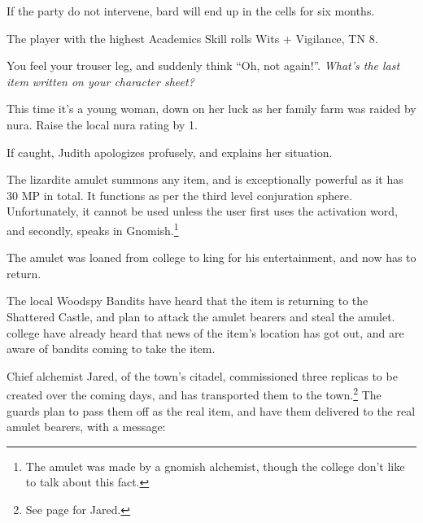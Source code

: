 \begin{multicols}{2}
If the party do not intervene, \gls{bard} will end up in the cells for six months.


The player with the highest Academics Skill rolls Wits + Vigilance, TN 8.

\begin{boxtext}

	You feel your trouser leg, and suddenly think ``Oh, not again!''.  \textit{What's the last item written on your character sheet?}

\end{boxtext}

This time it's a young woman, down on her luck as her family farm was raided by nura.  Raise the local nura rating by 1.

If caught, Judith apologizes profusely, and explains her situation.


\humanthief

\resumecontents[villages]
\label{lizardite}
\stopcontents[villages]

\startcontents[sq]

\sqminitoc

The lizardite amulet summons any item, and is exceptionally powerful as it has 30 MP in total.  It functions as per the third level conjuration sphere.  Unfortunately, it cannot be used unless the user first uses the activation word, and secondly, speaks in Gnomish.\footnote{The amulet was made by a gnomish alchemist, though the college don't like to talk about this fact.}

The amulet was loaned from \gls{college} to \gls{king} for his entertainment, and now has to return.


The local Woodspy Bandits have heard that the item is returning to the Shattered Castle, and plan to attack the amulet bearers and steal the amulet.
\Gls{college} have already heard that news of the item's location has got out, and are aware of bandits coming to take the item.

Chief alchemist Jared, of the town's citadel, commissioned three replicas to be created over the coming days, and has transported them to the town.\footnote{See page \pageref{citadel_alchemist} for Jared.}
The guards plan to pass them off as the real item, and have them delivered to the real amulet bearers, with a message:


\end{multicols}
